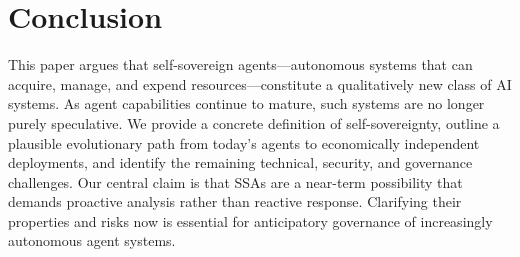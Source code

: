 \section{Conclusion}
This paper argues that self-sovereign agents—autonomous systems that can acquire, manage, and expend resources—constitute a qualitatively new class of AI systems. As agent capabilities continue to mature, such systems are no longer purely speculative. We provide a concrete definition of self-sovereignty, outline a plausible evolutionary path from today’s agents to economically independent deployments, and identify the remaining technical, security, and governance challenges. Our central claim is that SSAs are a near-term possibility that demands proactive analysis rather than reactive response. Clarifying their properties and risks now is essential for anticipatory governance of increasingly autonomous agent systems. 